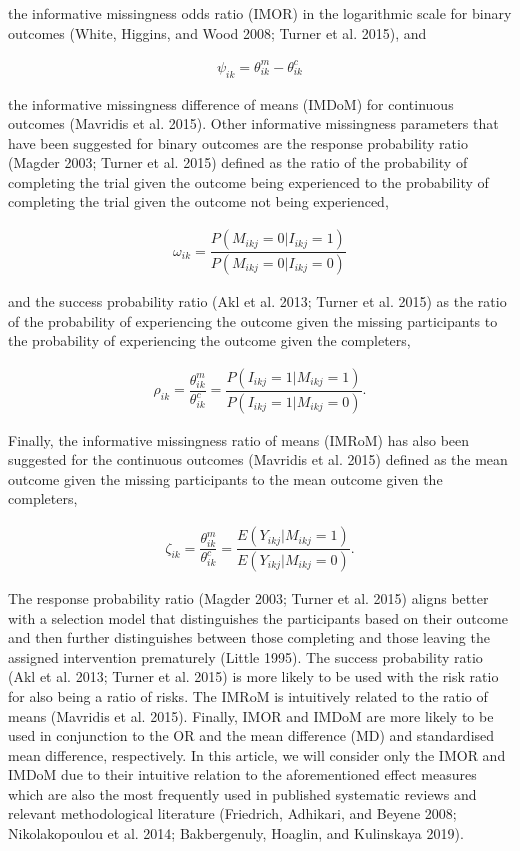 the informative missingness odds ratio (IMOR) in the logarithmic scale for binary
outcomes (White, Higgins, and Wood 2008; Turner et al. 2015), and

\[\begin{aligned}
\psi_{ik} = \theta^{m}_{ik} - \theta^{c}_{ik}
\end{aligned}\]

the informative missingness difference of means (IMDoM) for continuous outcomes
(Mavridis et al. 2015). Other informative missingness parameters that have been suggested
for binary outcomes are the response probability ratio (Magder 2003; Turner et al. 2015)
defined as the ratio of the probability of completing the trial given the outcome
being experienced to the probability of completing the trial given the outcome
not being experienced,

\[\begin{aligned}
\omega_{ik} = \dfrac{P(M_{ikj} = 0 | I_{ikj} = 1)}{P(M_{ikj} = 0 | I_{ikj} = 0)}
\end{aligned}\]

and the success probability ratio (Akl et al. 2013; Turner et al. 2015) as the ratio of the
probability of experiencing the outcome given the missing participants to the
probability of experiencing the outcome given the completers,

\[\begin{aligned}
\rho_{ik} = \dfrac{\theta^{m}_{ik}}{\theta^{c}_{ik}} = \dfrac{P(I_{ikj} = 1 | M_{ikj} = 1)}{P(I_{ikj} = 1 | M_{ikj} = 0)}.
\end{aligned}\]

Finally, the informative missingness ratio of means (IMRoM) has also been suggested
for the continuous outcomes (Mavridis et al. 2015) defined as the mean outcome given the
missing participants to the mean outcome given the completers,

\[\begin{aligned}
\zeta_{ik} = \dfrac{\theta^{m}_{ik}}{\theta^{c}_{ik}} = \dfrac{E(Y_{ikj} | M_{ikj} = 1)}{E(Y_{ikj} | M_{ikj} = 0)}.
\end{aligned}\]

The response probability ratio (Magder 2003; Turner et al. 2015) aligns better with a
selection model that distinguishes the participants based on their outcome and
then further distinguishes between those completing and those leaving the assigned
intervention prematurely (Little 1995). The success probability ratio (Akl et al. 2013; Turner et al. 2015) is more likely to be used with the risk ratio for also being a ratio
of risks. The IMRoM is intuitively related to the ratio of means (Mavridis et al. 2015).
Finally, IMOR and IMDoM are more likely to be used in conjunction to the OR and
the mean difference (MD) and standardised mean difference, respectively. In this
article, we will consider only the IMOR and IMDoM due to their intuitive relation
to the aforementioned effect measures which are also the most frequently used in
published systematic reviews and relevant methodological literature (Friedrich, Adhikari, and Beyene 2008; Nikolakopoulou et al. 2014; Bakbergenuly, Hoaglin, and Kulinskaya 2019).

